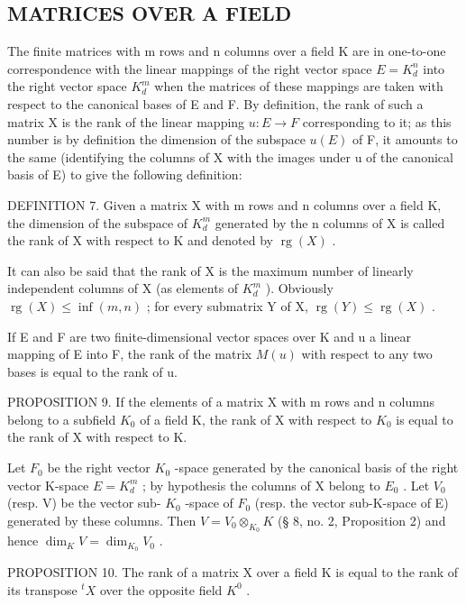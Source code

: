 \subsection{MATRICES OVER A FIELD}

The finite matrices with m rows and n columns over a field K are in one-to-one correspondence with the linear mappings of the right vector space \(E = K_{d}^{n}\) into the right vector space \(K_{d}^{m}\) when the matrices of these mappings are taken with respect to the canonical bases of E and F. By definition, the rank of such a matrix X is the rank of the linear mapping \(u: E \to F\) corresponding to it; as this number is by definition the dimension of the subspace \(u(E)\) of F, it amounts to the same (identifying the columns of X with the images under u of the canonical basis of E) to give the following definition:

DEFINITION 7. Given a matrix X with m rows and n columns over a field K, the dimension of the subspace of \(K_{d}^{m}\) generated by the n columns of X is called the rank of X with respect to K and denoted by \(\operatorname{rg}(X)\) .

It can also be said that the rank of X is the maximum number of linearly independent columns of X (as elements of \(K_{d}^{m}\) ). Obviously \(\operatorname{rg}(X) \leqslant \inf(m, n)\) ; for every submatrix Y of X, \(\operatorname{rg}(Y) \leqslant \operatorname{rg}(X)\) .

If E and F are two finite-dimensional vector spaces over K and u a linear mapping of E into F, the rank of the matrix \(M(u)\) with respect to any two bases is equal to the rank of u.

PROPOSITION 9. If the elements of a matrix X with m rows and n columns belong to a subfield \(K_{0}\) of a field K, the rank of X with respect to \(K_{0}\) is equal to the rank of X with respect to K.

Let \(F_{0}\) be the right vector \(K_{0}\) -space generated by the canonical basis of the right vector K-space \(E = K_{d}^{m}\) ; by hypothesis the columns of X belong to \(E_{0}\) . Let \(V_{0}\) (resp. V) be the vector sub- \(K_{0}\) -space of \(F_{0}\) (resp. the vector sub-K-space of E) generated by these columns. Then \(V = V_{0} \otimes_{K_{0}} K\) (§ 8, no. 2, Proposition 2) and hence \(\dim_{K} V = \dim_{K_{0}} V_{0}\) .

PROPOSITION 10. The rank of a matrix X over a field K is equal to the rank of its transpose \(^{t}X\) over the opposite field \(K^{0}\) .

